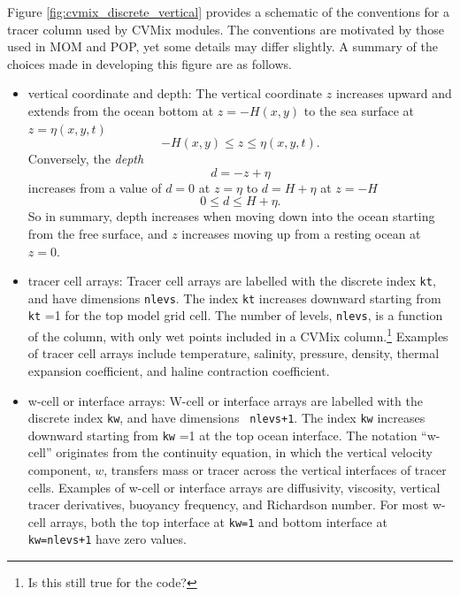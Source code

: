 Figure \ref{fig:cvmix_discrete_vertical} provides a schematic of the
conventions for a tracer column used by CVMix modules. The conventions
are motivated by those used in MOM and POP, yet some details may
differ slightly.  A summary of the choices made in developing this
figure are as follows.
\begin{itemize}

\item {\sc vertical coordinate and depth}: The vertical coordinate $z$ increases
  upward and extends from the ocean bottom at $z=-H(x,y)$ to the sea
  surface at $z = \eta(x,y,t)$
\begin{equation}
   -H(x,y) \le z \le \eta(x,y,t).
\end{equation}
Conversely, the {\it depth} 
\begin{equation}
   d = -z + \eta 
\label{eq:depth-defined}
\end{equation} 
increases from a value of $d=0$ at $z=\eta$ to $d = H+\eta$ at $z=-H$
\begin{equation}
  0 \le   d \le H+\eta. 
\end{equation}
So in summary, depth increases when moving down into the ocean
starting from the free surface, and $z$ increases moving up from a
resting ocean at $z=0$.

\item {\sc tracer cell arrays}: Tracer cell arrays are labelled with
  the discrete index {\tt kt}, and have dimensions {\tt nlevs}.  The
  index {\tt kt} increases downward starting from {\tt kt} =1 for the
  top model grid cell.  The number of levels, {\tt nlevs}, is a
  function of the column, with only wet points included in a CVMix
  column.\footnote{\color{red} Is this still true for the code?}
  Examples of tracer cell arrays include temperature, salinity,
  pressure, density, thermal expansion coefficient, and haline
  contraction coefficient.

\item {\sc w-cell or interface arrays}: W-cell or interface arrays are
  labelled with the discrete index {\tt kw}, and have dimensions {\tt
    nlevs+1}.  The index {\tt kw} increases downward starting from
  {\tt kw} =1 at the top ocean interface.  The notation ``w-cell''
  originates from the continuity equation, in which the vertical
  velocity component, $w$, transfers mass or tracer across the
  vertical interfaces of tracer cells.  Examples of w-cell or
  interface arrays are diffusivity, viscosity, vertical tracer
  derivatives, buoyancy frequency, and Richardson number.  For most
  w-cell arrays, both the top interface at {\tt kw=1} and bottom
  interface at {\tt kw=nlevs+1} have zero values.


\end{itemize}
